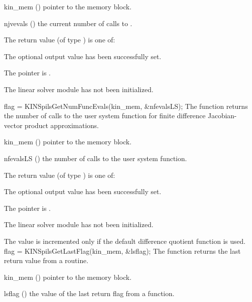 {
  \begin{args}
  \item[kin\_mem] ()
    pointer to the {\kinsol} memory block.
  \item[njvevals] ()
    the current number of calls to .
  \end{args}
}
{
  The return value  (of type ) is one of:
  \begin{args}
  \item[\Id{KINSPILS\_SUCCESS}] 
    The optional output value has been successfully set.
  \item[\Id{KINSPILS\_MEM\_NULL}]
    The  pointer is .
  \item[\Id{KINSPILS\_LMEM\_NULL}]
    The linear solver module has not been initialized.
  \end{args}
}
{}
{
  flag = KINSpilsGetNumFuncEvals(kin\_mem, \&nfevalsLS);
}
{
  The function  returns the
  number of calls to the user system function for
  finite difference Jacobian-vector product approximations.
}
{
  \begin{args}
  \item[kin\_mem] ()
    pointer to the {\kinsol} memory block.
  \item[nfevalsLS] ()
    the number of calls to the user system function.
  \end{args}
}
{
  The return value  (of type ) is one of:
  \begin{args}
  \item[\Id{KINSPILS\_SUCCESS}] 
    The optional output value has been successfully set.
  \item[\Id{KINSPILS\_MEM\_NULL}]
    The  pointer is .
  \item[\Id{KINSPILS\_LMEM\_NULL}]
    The linear solver module has not been initialized.
  \end{args}
}
{
  The value  is incremented only if the default 
   difference quotient function is used.
}
{
  flag = KINSpilsGetLastFlag(kin\_mem, \&lsflag);
}
{
  The function  returns the
  last return value from a {\kinspils} routine. 
}
{
  \begin{args}
  \item[kin\_mem] ()
    pointer to the {\kinsol} memory block.
  \item[lsflag] ()
    the value of the last return flag from a {\kinspils} function.
  \end{args}
}
